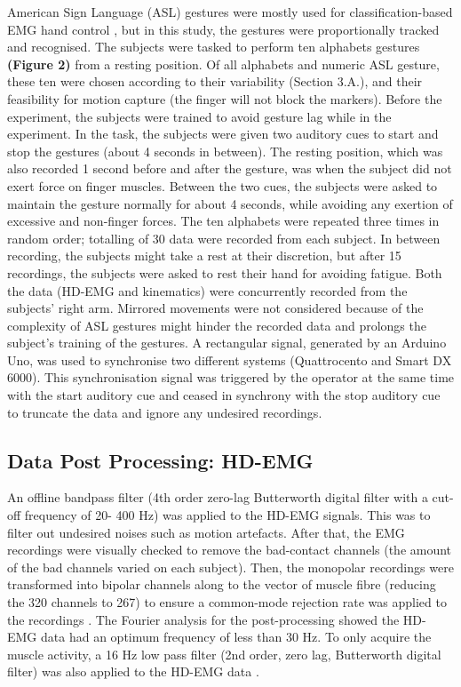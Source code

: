 \documentclass[conference]{IEEEtran}
\begin{document}
American Sign Language (ASL) gestures were mostly used for classification-based EMG hand control 
\cite{b27}, but in this study, the gestures were proportionally tracked and recognised. The subjects were tasked to 
perform ten alphabets gestures \textbf{(Figure 2)} from a resting position. Of all alphabets and numeric ASL gesture, 
these ten were chosen according to their variability \cite{b28} (Section 3.A.), and their feasibility for motion 
capture (the finger will not block the markers). Before the experiment, the subjects were trained to avoid 
gesture lag while in the experiment. In the task, the subjects were given two auditory cues to start and stop 
the gestures (about 4 seconds in between). The resting position, which was also recorded 1 second before 
and after the gesture, was when the subject did not exert force on finger muscles. Between the two cues, the 
subjects were asked to maintain the gesture normally for about 4 seconds, while avoiding any exertion of 
excessive and non-finger forces. The ten alphabets were repeated three times in random order; totalling of 
30 data were recorded from each subject. In between recording, the subjects might take a rest at their 
discretion, but after 15 recordings, the subjects were asked to rest their hand for avoiding fatigue.
Both the data (HD-EMG and kinematics) were concurrently recorded from the subjects’ right arm. 
Mirrored movements \cite{b9} were not considered because of the complexity of ASL gestures might hinder the 
recorded data and prolongs the subject’s training of the gestures. A rectangular signal, generated by an 
Arduino Uno, was used to synchronise two different systems (Quattrocento and Smart DX 6000). This 
synchronisation signal was triggered by the operator at the same time with the start auditory cue and ceased 
in synchrony with the stop auditory cue to truncate the data and ignore any undesired recordings.

\subsection{Data Post Processing: HD-EMG}
An offline bandpass filter (4th order zero-lag Butterworth digital filter with a cut-off frequency of 20-
400 Hz) was applied to the HD-EMG signals. This was to filter out undesired noises such as motion artefacts. 
After that, the EMG recordings were visually checked to remove the bad-contact channels (the amount of 
the bad channels varied on each subject). Then, the monopolar recordings were transformed into bipolar 
channels along to the vector of muscle fibre (reducing the 320 channels to 267) to ensure a common-mode 
rejection rate was applied to the recordings \cite{b9}. The Fourier analysis for the post-processing showed the HD-EMG data had an optimum frequency of less than 30 Hz. To only acquire the muscle activity, a 
16 Hz low pass filter (2nd order, zero lag, Butterworth digital filter) was also applied to the HD-EMG data 
\cite{b9}\cite{b29}.
\end{document}
